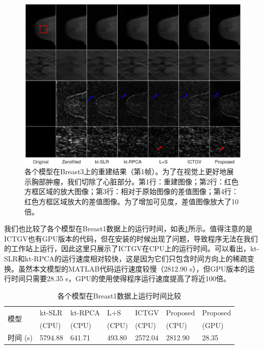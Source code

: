 \begin{figure}
\centering
\includegraphics[width=1\textwidth]{img/tgvnn/breast3.eps}
\caption{各个模型在Breast3上的重建结果（第1帧）。为了在视觉上更好地展示胸部肿瘤，我们切除了心脏部分。第1行：重建图像；第2行：红色方框区域的放大图像；第3行：相对于原始图像的差值图像；第4行：红色方框区域放大的差值图像。为了增加可见度，差值图像放大了10倍。}
\label{fig:breast3}
\end{figure} 

我们也比较了各个模型在Breast1数据上的运行时间，如表\ref{tab:time3}所示。值得注意的是ICTGV也有GPU版本的代码，但在安装的时候出现了问题，导致程序无法在我们的工作站上运行，因此这里只展示了ICTGV在CPU上的运行时间。可以看出，kt-SLR和kt-RPCA的运行速度相对较快，这是因为它们只包含时间方向上的稀疏变换。虽然本文模型的MATLAB代码运行速度较慢（2812.90 s），但GPU版本的运行时间只需要28.35 s，GPU的使用使得程序运行速度提高了将近100倍。
\begin{table}
\centering
\caption{各个模型在Breast1数据上运行时间比较}
\begin{center}
\begin{tabular}{|l|l|l|l|l|l|l|}
\hline
\hline
\multirow{2}{*}{模型} & kt-SLR & kt-RPCA & L+S & ICTGV & Proposed & Proposed \\
& (CPU) & (CPU) & (CPU) & (CPU) & (CPU) & (GPU) \\
\hline
时间 (s) & 5794.88 & 641.71 & 493.80 & 2572.04 & 2812.90 & 28.35 \\
\hline
\end{tabular}
\end{center}
\label{tab:time3}
\end{table}

